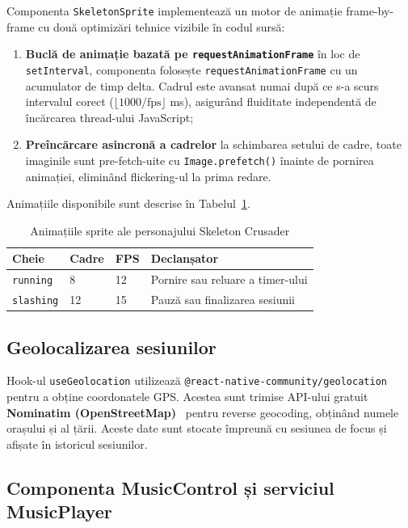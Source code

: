 \documentclass[12pt, a4paper, twoside]{report}
\numberwithin{equation}{section}
\begin{document}
Componenta \texttt{SkeletonSprite} implementează un motor de animație frame-by-frame
cu două optimizări tehnice vizibile în codul sursă:
\begin{enumerate}
  \item \textbf{Buclă de animație bazată pe \texttt{requestAnimationFrame}}
    \textemdash{} în loc de \texttt{setInterval}, componenta folosește
    \texttt{requestAnimationFrame} cu un acumulator de timp delta. Cadrul este
    avansat numai după ce s-a scurs intervalul corect
    ($\lfloor 1000/\text{fps} \rfloor$ ms), asigurând fluiditate independentă
    de încărcarea thread-ului JavaScript;
  \item \textbf{Preîncărcare asincronă a cadrelor} \textemdash{} la schimbarea
    setului de cadre, toate imaginile sunt pre-fetch-uite cu \texttt{Image.prefetch()}
    înainte de pornirea animației, eliminând flickering-ul la prima redare.
\end{enumerate}

Animațiile disponibile sunt descrise în Tabelul~\ref{tab:animations}.

\begin{table}[H]
\centering
\caption{Animațiile sprite ale personajului Skeleton Crusader}
\label{tab:animations}
\begin{tabular}{llll}
\toprule
\textbf{Cheie} & \textbf{Cadre} & \textbf{FPS} & \textbf{Declanșator} \\
\midrule
\texttt{running} & 8 & 12 & Pornire sau reluare a timer-ului \\
\texttt{slashing} & 12 & 15 & Pauză sau finalizarea sesiunii \\
\bottomrule
\end{tabular}
\end{table}

\subsection{Geolocalizarea sesiunilor}

Hook-ul \texttt{useGeolocation} utilizează \texttt{@react-native-community/geolocation}
pentru a obține coordonatele GPS. Acestea sunt trimise API-ului gratuit
\textbf{Nominatim (OpenStreetMap)}~\cite{nominatim} pentru reverse geocoding, obținând numele orașului
și al țării. Aceste date sunt stocate împreună cu sesiunea de focus și afișate în
istoricul sesiunilor.

\subsection{Componenta MusicControl și serviciul MusicPlayer}
\end{document}
